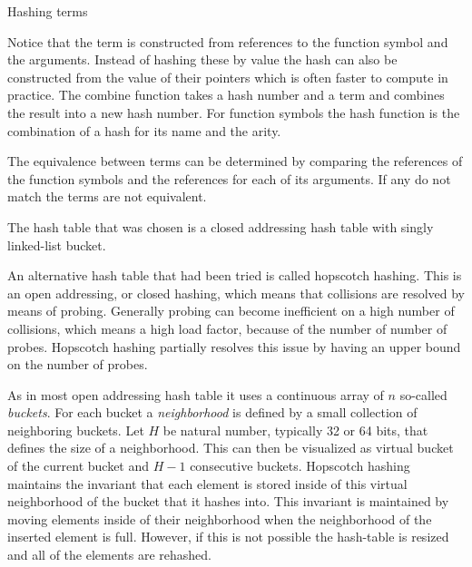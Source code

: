 \documentclass[10pt,a4paper]{article}
\begin{document}
\begin{algorithm}[H]
 \caption{Hashing terms}\label{alg:create_term}
 \begin{algorithmic}[1]
  \EndFor 
  \EndProcedure
\end{algorithmic}
\end{algorithm}

\noindent Notice that the term is constructed from references to the function symbol and the arguments.
Instead of hashing these by value the hash can also be constructed from the value of their pointers which is often faster to compute in practice.
The combine function takes a hash number and a term and combines the result into a new hash number.
For function symbols the hash function is the combination of a hash for its name and the arity.

The equivalence between terms can be determined by comparing the references of the function symbols and the references for each of its arguments.
If any do not match the terms are not equivalent.

The hash table that was chosen is a closed addressing hash table with singly linked-list bucket.

An alternative hash table that had been tried is called hopscotch hashing.
This is an open addressing, or closed hashing, which means that collisions are resolved by means of probing.
Generally probing can become inefficient on a high number of collisions, which means a high load factor, because of the number of number of probes.
Hopscotch hashing partially resolves this issue by having an upper bound on the number of probes.

As in most open addressing hash table it uses a continuous array of $n$ so-called \emph{buckets}.
For each bucket a \emph{neighborhood} is defined by a small collection of neighboring buckets.
Let $H$ be natural number, typically 32 or 64 bits, that defines the size of a neighborhood.
This can then be visualized as virtual bucket of the current bucket and $H-1$ consecutive buckets.
Hopscotch hashing maintains the invariant that each element is stored inside of this virtual neighborhood of the bucket that it hashes into.
This invariant is maintained by moving elements inside of their neighborhood when the neighborhood of the inserted element is full.
However, if this is not possible the hash-table is resized and all of the elements are rehashed.
\end{document}
